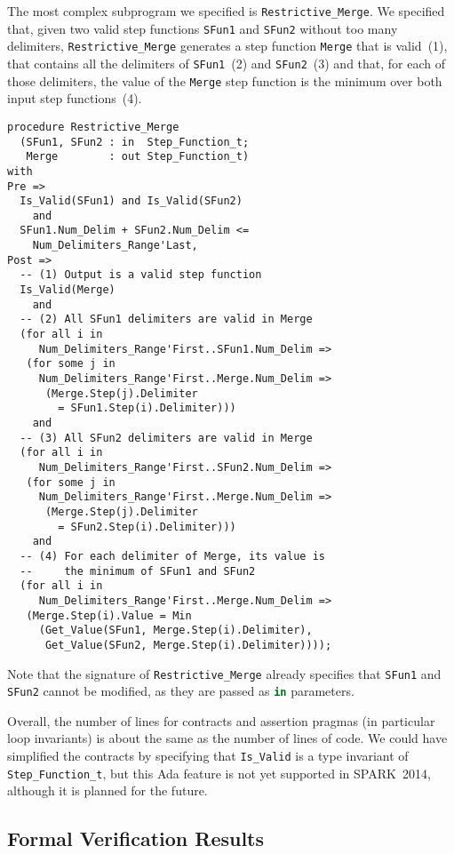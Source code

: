 \documentclass[10pt,a4paper,twocolumn]{article}
\newcommand{\newspark}{SPARK~2014\xspace}
\newcommand{\SPARK}[1]{\lstinline[language=Ada,basicstyle={\footnotesize
      \sffamily},framesep=0pt]$#1$}
\begin{document}
The most complex subprogram we specified is \SPARK{Restrictive_Merge}.  We
specified that, given two valid step functions \SPARK{SFun1} and \SPARK{SFun2}
without too many delimiters, \SPARK{Restrictive_Merge} generates a step
function \SPARK{Merge} that is valid~(1), that contains all the delimiters of
\SPARK{SFun1}~(2) and \SPARK{SFun2}~(3) and that, for each of those delimiters,
the value of the \SPARK{Merge} step function is the minimum over both input
step functions~(4).

\begin{lstlisting}
procedure Restrictive_Merge
  (SFun1, SFun2 : in  Step_Function_t;
   Merge        : out Step_Function_t)
with
Pre =>
  Is_Valid(SFun1) and Is_Valid(SFun2)
    and
  SFun1.Num_Delim + SFun2.Num_Delim <=
    Num_Delimiters_Range'Last,
Post =>
  -- (1) Output is a valid step function
  Is_Valid(Merge)
    and
  -- (2) All SFun1 delimiters are valid in Merge
  (for all i in
     Num_Delimiters_Range'First..SFun1.Num_Delim =>
   (for some j in
     Num_Delimiters_Range'First..Merge.Num_Delim =>
      (Merge.Step(j).Delimiter
        = SFun1.Step(i).Delimiter)))
    and
  -- (3) All SFun2 delimiters are valid in Merge
  (for all i in
     Num_Delimiters_Range'First..SFun2.Num_Delim =>
   (for some j in
     Num_Delimiters_Range'First..Merge.Num_Delim =>
      (Merge.Step(j).Delimiter
        = SFun2.Step(i).Delimiter)))
    and
  -- (4) For each delimiter of Merge, its value is
  --     the minimum of SFun1 and SFun2
  (for all i in
     Num_Delimiters_Range'First..Merge.Num_Delim =>
   (Merge.Step(i).Value = Min
     (Get_Value(SFun1, Merge.Step(i).Delimiter),
      Get_Value(SFun2, Merge.Step(i).Delimiter))));
\end{lstlisting}

Note that the signature of \SPARK{Restrictive_Merge} already specifies that
\SPARK{SFun1} and \SPARK{SFun2} cannot be modified, as they are passed as
\SPARK{in} parameters.

Overall, the number of lines for contracts and assertion pragmas (in particular
loop invariants) is about the same as the number of lines of code. We could
have simplified the contracts by specifying that \SPARK{Is_Valid} is a type
invariant of \SPARK{Step_Function_t}, but this Ada feature is not yet supported
in \newspark, although it is planned for the future.

\subsection{Formal Verification Results}
\end{document}
